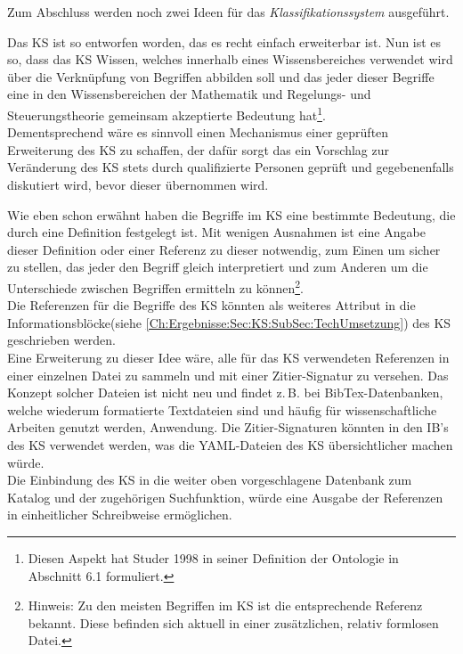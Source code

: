 Zum Abschluss werden noch zwei Ideen für das \textit{Klassifikationssystem} ausgeführt.

Das KS ist so entworfen worden, das es recht einfach erweiterbar ist. Nun ist es so, dass das KS Wissen, welches innerhalb eines Wissensbereiches verwendet wird über die Verknüpfung von Begriffen abbilden soll und das jeder dieser Begriffe eine in den Wissensbereichen der Mathematik und Regelungs- und Steuerungstheorie gemeinsam akzeptierte Bedeutung hat\footnote{Diesen Aspekt hat Studer 1998 in seiner Definition der Ontologie in \cite{STBEFE98} Abschnitt 6.1 formuliert.}.\\
Dementsprechend wäre es sinnvoll einen Mechanismus einer geprüften Erweiterung des KS zu schaffen, der dafür sorgt das ein Vorschlag zur Veränderung des KS stets durch qualifizierte Personen geprüft und gegebenenfalls diskutiert wird, bevor dieser übernommen wird.

Wie eben schon erwähnt haben die Begriffe im KS eine bestimmte Bedeutung, die durch eine Definition festgelegt ist. Mit wenigen Ausnahmen ist eine Angabe dieser Definition oder einer Referenz zu dieser notwendig, zum Einen um sicher zu stellen, das jeder den Begriff gleich interpretiert und zum Anderen um die Unterschiede zwischen Begriffen ermitteln zu können\footnote{Hinweis: Zu den meisten Begriffen im KS ist die entsprechende Referenz bekannt. Diese befinden sich aktuell in einer zusätzlichen, relativ formlosen Datei.}.\\
Die Referenzen für die Begriffe des KS könnten als weiteres Attribut in die Informationsblöcke(siehe \autoref{Ch:Ergebnisse:Sec:KS:SubSec:TechUmsetzung}) des KS geschrieben werden.\\
Eine Erweiterung zu dieser Idee wäre, alle für das KS verwendeten Referenzen in einer einzelnen Datei zu sammeln und mit einer Zitier-Signatur zu versehen. Das Konzept solcher Dateien ist nicht neu und findet z.\,B. bei BibTex-Datenbanken, welche wiederum formatierte Textdateien sind und häufig für wissenschaftliche Arbeiten genutzt werden, Anwendung. Die Zitier-Signaturen könnten in den IB's des KS verwendet werden, was die YAML-Dateien des KS übersichtlicher machen würde. \\
Die Einbindung des KS in die weiter oben vorgeschlagene Datenbank zum Katalog und der zugehörigen Suchfunktion, würde eine Ausgabe der Referenzen in einheitlicher Schreibweise ermöglichen.


